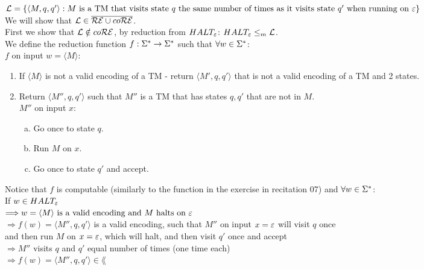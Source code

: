 $\mathcal{L} = \{\langle M, q, q' \rangle : M \text{ is a TM that visits state } q \\ \text{ the same number of times
                as it visits state } q' \text{ when running on } \varepsilon\}$ \\

We will show that $\mathcal{L} \in \overline{\mathcal{R}\mathcal{E} \cup co\mathcal{R}\mathcal{E}}$. \\

First we show that $\mathcal{L} \notin co\mathcal{R}\mathcal{E}$, by reduction from $HALT_\varepsilon$: $HALT_\varepsilon \leq_m \mathcal{L}$. \\

We define the reduction function $f: \Sigma^* \rightarrow \Sigma^*$ such that $\forall w \in \Sigma^*$:\\
$f$ on input $w = \langle M \rangle$:
\begin{enumerate}[1., itemsep=5pt]

        \item If $\langle M \rangle$ is not a valid encoding of a TM - return $\langle M', q, q' \rangle$
              that is not a valid encoding of a TM and 2 states.

        \item Return $\langle M'', q, q' \rangle$ such that $M''$ is a TM that has states $q, q'$
              that are not in $M$. \\
              \qquad $M''$ on input $x$:

              \begin{enumerate}[a., itemsep=5pt]
                      \item Go once to state $q$.
                      \item Run $M$ on $x$.
                      \item Go once to state $q'$ and accept.
              \end{enumerate}

\end{enumerate}

Notice that $f$ is computable (similarly to the function in the exercise in recitation 07) and $\forall w \in \Sigma^*$: \\
If $w \in HALT_\varepsilon$ \\
$\Longrightarrow w = \langle M \rangle \text{ is a valid encoding and } M \text{ halts on } \varepsilon$ \\
$\Longrightarrow f(w) = \langle M'', q, q' \rangle$ is a valid encoding, such that $M''$ on input $x = \varepsilon$ will visit $q$ once \\
and then run $M$ on $x = \varepsilon$, which will halt, and then visit $q'$ once and accept \\
$\Longrightarrow M''$ visits $q$ and $q'$ equal number of times (one time each) \\
$\Longrightarrow f(w) = \langle M'', q, q' \rangle \in \lang$ \\

